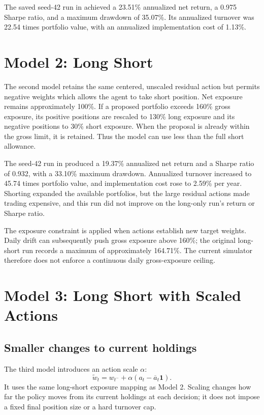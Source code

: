 \documentclass[11pt,letterpaper]{article}
\begin{document}
The saved seed-42 run in  achieved a 23.51\% annualized
net return, a 0.975 Sharpe ratio, and a maximum drawdown of 35.07\%.
Its annualized turnover was 22.54 times portfolio value, with an annualized
implementation cost of 1.13\%.

\section{Model 2: Long Short}

The second model retains the same centered, unscaled residual action but permits
negative weights which allows the agent to take short position. Net exposure remains approximately 100\%. If a proposed
portfolio exceeds 160\% gross exposure, its positive positions are rescaled to
130\% long exposure and its negative positions to 30\% short exposure. When the
proposal is already within the gross limit, it is retained. Thus the model can
use less than the full short allowance.

The seed-42 run in  produced a 19.37\% annualized net
return and a Sharpe ratio of 0.932, with a 33.10\% maximum drawdown.
Annualized turnover increased to 45.74 times portfolio value, and implementation
cost rose to 2.59\% per year. Shorting expanded the available portfolios, but the
large residual actions made trading expensive, and this run did not improve on
the long-only run's return or Sharpe ratio.

The exposure constraint is applied when actions establish new target weights.
Daily drift can subsequently push gross exposure above 160\%; the original
long-short run records a maximum of approximately 164.71\%. The current simulator
therefore does not enforce a continuous daily gross-exposure ceiling.

\section{Model 3: Long Short with Scaled Actions}

\subsection{Smaller changes to current holdings}

The third model introduces an action scale $\alpha$:
\[
  \widetilde w_t
    = w_{t^-} + \alpha\left(a_t-\overline a_t\mathbf{1}\right).
\]
It uses the same long-short exposure mapping as Model 2. Scaling changes how far
the policy moves from its current holdings at each decision; it does not impose
a fixed final position size or a hard turnover cap.
\end{document}
